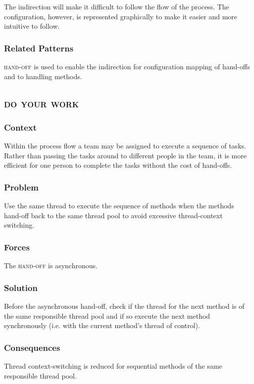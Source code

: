 \documentclass[prodmode]{style/acmlarge}
\begin{document}
The indirection will make it difficult to follow the flow of the process.  The
configuration, however, is represented graphically to make it easier and more
intuitive to follow.

\subsubsection*{Related Patterns} \textsc{hand-off} is used to enable the
indirection for configuration mapping of hand-offs and to handling methods.




\subsection{\textsc{\textbf{do your work}}}

\subsubsection*{Context} Within the process flow a team may be assigned to
execute a sequence of tasks. Rather than passing the tasks around to different
people in the team, it is more efficient for one person to complete the tasks
without the cost of hand-offs.

\subsubsection*{Problem} Use the same thread to execute the sequence of methods
when the methods hand-off back to the same thread pool to avoid excessive
thread-context switching.

\subsubsection*{Forces} The \textsc{hand-off} is asynchronous.

\subsubsection*{Solution} Before the asynchronous hand-off, check if the thread
for the next method is of the same responsible thread pool and if so execute the
next method synchronously (i.e. with the current method's thread of control).

\subsubsection*{Consequences} Thread context-switching is reduced for sequential
methods of the same responsible thread pool.
\end{document}
